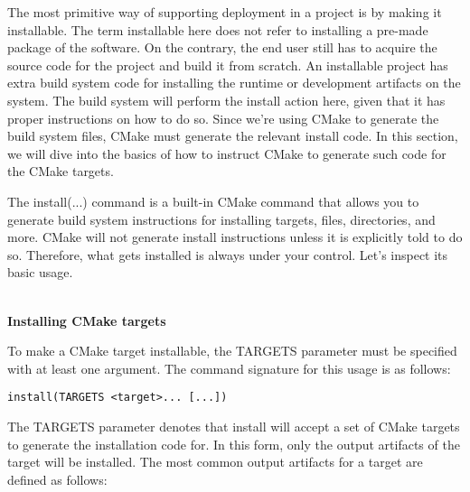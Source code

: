 The most primitive way of supporting deployment in a project is by making it installable. The term installable here does not refer to installing a pre-made package of the software. On the contrary, the end user still has to acquire the source code for the project and build it from scratch. An installable project has extra build system code for installing the runtime or development artifacts on the system. The build system will perform the install action here, given that it has proper instructions on how to do so. Since we're using CMake to generate the build system files, CMake must generate the relevant install code. In this section, we will dive into the basics of how to instruct CMake to generate such code for the CMake targets.


The install(...) command is a built-in CMake command that allows you to generate build system instructions for installing targets, files, directories, and more. CMake will not generate install instructions unless it is explicitly told to do so. Therefore, what gets installed is always under your control. Let's inspect its basic usage.

\hspace*{\fill} \\ %
\noindent
\textbf{Installing CMake targets}

To make a CMake target installable, the TARGETS parameter must be specified with at least one argument. The command signature for this usage is as follows:

\begin{lstlisting}[style=styleCMake]
install(TARGETS <target>... [...])
\end{lstlisting}

The TARGETS parameter denotes that install will accept a set of CMake targets to generate the installation code for. In this form, only the output artifacts of the target will be installed. The most common output artifacts for a target are defined as follows:

